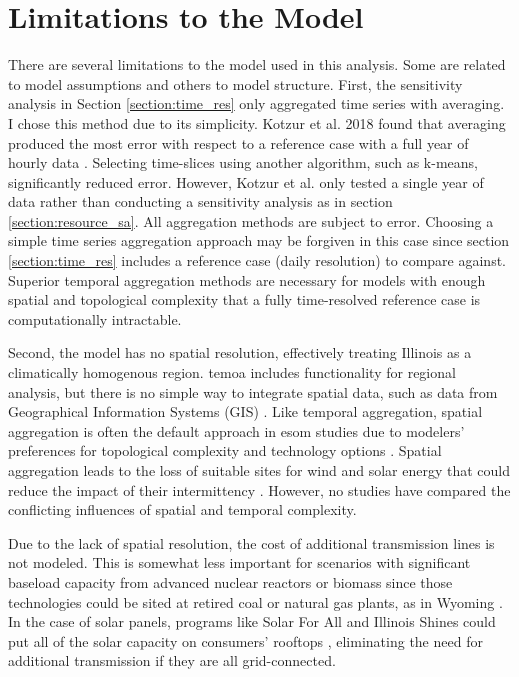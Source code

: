 \section{Limitations to the Model}

There are several limitations to the model used in this analysis. Some are related
to model assumptions and others to model structure. First, the sensitivity analysis
in Section \ref{section:time_res} only aggregated time series with averaging. I
chose this method due to its simplicity. Kotzur et al. 2018 found that averaging
produced the most error with respect to a reference case with a full year of
hourly data \cite{kotzur_impact_2018}. Selecting time-slices using another algorithm,
such as k-means, significantly reduced error. However, Kotzur et al. only tested a single
year of data rather than conducting a sensitivity analysis as in section
\ref{section:resource_sa}. All aggregation methods are subject to error. Choosing
a simple time series aggregation approach may be forgiven in this case since section
\ref{section:time_res} includes a reference case (daily resolution) to compare against.
Superior temporal aggregation methods are necessary for models with enough
spatial and topological complexity that a fully time-resolved reference case is
computationally intractable.

Second, the model has no spatial resolution, effectively treating Illinois as a
climatically homogenous region. \gls{temoa} includes functionality for regional
analysis, but there is no simple way to integrate spatial data, such
as data from Geographical Information Systems (GIS) \cite{martinez-gordon_review_2021}.
Like temporal aggregation, spatial aggregation is often the default approach in
\gls{esom} studies due to modelers' preferences for topological complexity and
technology options \cite{martinez-gordon_review_2021,poncelet_impact_2016}. Spatial
aggregation leads to the loss of suitable sites for wind and solar energy that could
reduce the impact of their intermittency \cite{fleischer_minimising_2020}. However,
no studies have compared the conflicting influences of spatial and temporal complexity.

Due to the lack of spatial resolution, the cost of additional transmission lines
is not modeled. This is somewhat less important for scenarios with significant
baseload capacity from advanced nuclear reactors or biomass since those technologies
could be sited at retired coal or natural gas plants, as in Wyoming
\cite{associated_press_bill_2021}. In the case of solar panels, programs like Solar
For All and Illinois Shines \cite{chicago_illinois_nodate, noauthor_illinois_nodate}
could put all of the solar capacity on consumers' rooftops \cite{lopez_us_2012},
eliminating the need for additional transmission if they are all grid-connected.

